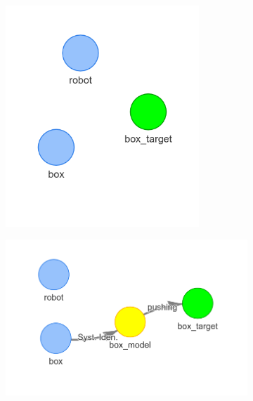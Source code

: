 \begin{figure}[H]
    \centering
    \begin{subfigure}{.3\textwidth}
    \centering
    \includegraphics[width=0.8\textwidth]{figures/proposed_method/connecting_nodes/robot_push/robot_push_1}
    \caption{}
    \end{subfigure}
    \begin{subfigure}{.3\textwidth}
    \centering
    \includegraphics[width=1.1\textwidth]{figures/proposed_method/connecting_nodes/robot_push/robot_push_2}
    \caption{}\label{subfig:robot_push_2}
    \end{subfigure}
    \begin{subfigure}{.3\textwidth}

\end{subfigure}
\end{figure}
